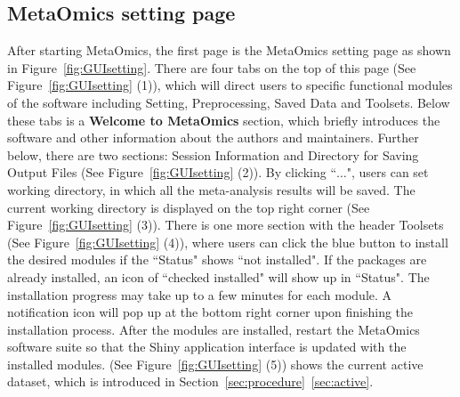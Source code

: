 \subsection{MetaOmics setting page}
\label{sec:setting}
After starting MetaOmics, 
the first page is the MetaOmics setting page as shown in Figure~\ref{fig:GUIsetting}.  
There are four tabs on the top of this page (See Figure~\ref{fig:GUIsetting} {\color{red} (1)}), 
which will direct users to specific functional modules of the software including Setting, Preprocessing, Saved Data and Toolsets.
Below these tabs is a {\bf Welcome to MetaOmics} section, which briefly introduces the software and other information about the authors and maintainers.
Further below, there are two sections: Session Information and Directory for Saving Output Files (See Figure~\ref{fig:GUIsetting} {\color{red} (2)}).
By clicking ``$\ldots$",
users can set working directory, in which all the meta-analysis results will be saved.
The current working directory is displayed on the top right corner (See Figure~\ref{fig:GUIsetting} {\color{red} (3)}).
There is one more section with the header Toolsets (See Figure~\ref{fig:GUIsetting} {\color{red} (4)}),
where users can click the blue button to install the desired modules if the ``Status" shows ``not installed".
If the packages are already installed, an icon of ``checked installed" will show up in ``Status".
The installation progress may take up to a few minutes for each module.
A notification icon will pop up at the bottom right corner upon finishing the installation process. 
After the modules are installed, restart the MetaOmics software suite so that the Shiny application interface is updated with the installed modules.
(See Figure~\ref{fig:GUIsetting} {\color{red} (5)}) shows the current active dataset, 
which is introduced in Section~\ref{sec:procedure}~\ref{sec:active}. 
 
